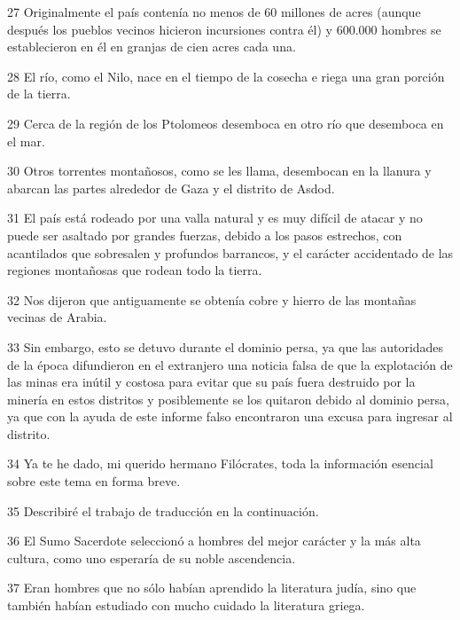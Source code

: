 \par 27 Originalmente el país contenía no menos de 60 millones de acres (aunque después los pueblos vecinos hicieron incursiones contra él) y 600.000 hombres se establecieron en él en granjas de cien acres cada una.

\par 28 El río, como el Nilo, nace en el tiempo de la cosecha e riega una gran porción de la tierra.

\par 29 Cerca de la región de los Ptolomeos desemboca en otro río que desemboca en el mar.

\par 30 Otros torrentes montañosos, como se les llama, desembocan en la llanura y abarcan las partes alrededor de Gaza y el distrito de Asdod.

\par 31 El país está rodeado por una valla natural y es muy difícil de atacar y no puede ser asaltado por grandes fuerzas, debido a los pasos estrechos, con acantilados que sobresalen y profundos barrancos, y el carácter accidentado de las regiones montañosas que rodean todo la tierra.

\par 32 Nos dijeron que antiguamente se obtenía cobre y hierro de las montañas vecinas de Arabia.

\par 33 Sin embargo, esto se detuvo durante el dominio persa, ya que las autoridades de la época difundieron en el extranjero una noticia falsa de que la explotación de las minas era inútil y costosa para evitar que su país fuera destruido por la minería en estos distritos y posiblemente se los quitaron debido al dominio persa, ya que con la ayuda de este informe falso encontraron una excusa para ingresar al distrito.

\par 34 Ya te he dado, mi querido hermano Filócrates, toda la información esencial sobre este tema en forma breve.

\par 35 Describiré el trabajo de traducción en la continuación.

\par 36 El Sumo Sacerdote seleccionó a hombres del mejor carácter y la más alta cultura, como uno esperaría de su noble ascendencia.

\par 37 Eran hombres que no sólo habían aprendido la literatura judía, sino que también habían estudiado con mucho cuidado la literatura griega.


